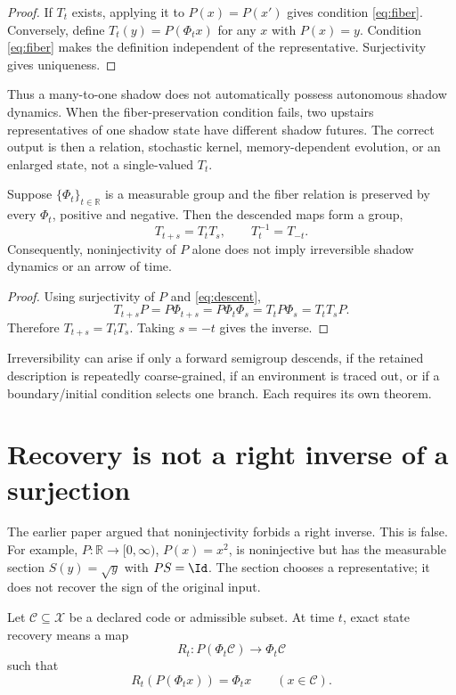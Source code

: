 \documentclass[11pt]{article}
\newcommand{\cX}{\mathcal X}
\newcommand{\cC}{\mathcal C}
\begin{document}
\begin{proof}
If $T_t$ exists, applying it to $P(x)=P(x')$ gives condition
\eqref{eq:fiber}. Conversely, define $T_t(y)=P(\Phi_t x)$ for any $x$ with
$P(x)=y$. Condition \eqref{eq:fiber} makes the definition independent of the
representative. Surjectivity gives uniqueness.
\end{proof}

Thus a many-to-one shadow does not automatically possess autonomous shadow dynamics.
When the fiber-preservation condition fails, two upstairs representatives of one
shadow state have different shadow futures. The correct output is then a relation,
stochastic kernel, memory-dependent evolution, or an enlarged state, not a
single-valued $T_t$.

\begin{theorem}\label{thm:reversible}
Suppose $\{\Phi_t\}_{t\in\mathbb R}$ is a measurable group and the fiber relation is
preserved by every $\Phi_t$, positive and negative. Then the descended maps form a
group,
\[
 T_{t+s}=T_tT_s,\qquad T_t^{-1}=T_{-t}.
\]
Consequently, noninjectivity of $P$ alone does not imply irreversible shadow
dynamics or an arrow of time.
\end{theorem}

\begin{proof}
Using surjectivity of $P$ and \eqref{eq:descent},
\[
T_{t+s}P=P\Phi_{t+s}=P\Phi_t\Phi_s=T_tP\Phi_s=T_tT_sP.
\]
Therefore $T_{t+s}=T_tT_s$. Taking $s=-t$ gives the inverse.
\end{proof}

Irreversibility can arise if only a forward semigroup descends, if the retained
description is repeatedly coarse-grained, if an environment is traced out, or if a
boundary/initial condition selects one branch. Each requires its own theorem.

\section{Recovery is not a right inverse of a surjection}

The earlier paper argued that noninjectivity forbids a right inverse. This is false.
For example, $P:\mathbb R\to[0,\infty)$, $P(x)=x^2$, is noninjective but has the
measurable section $S(y)=\sqrt y$ with $P S=\Id$. The section chooses a representative;
it does not recover the sign of the original input.

Let $\cC\subseteq\cX$ be a declared code or admissible subset. At time $t$, exact
state recovery means a map
\[
 R_t:P(\Phi_t\cC)\to\Phi_t\cC
\]
such that
\[
 R_t(P(\Phi_t x))=\Phi_t x\qquad(x\in\cC).
\]
\end{document}
